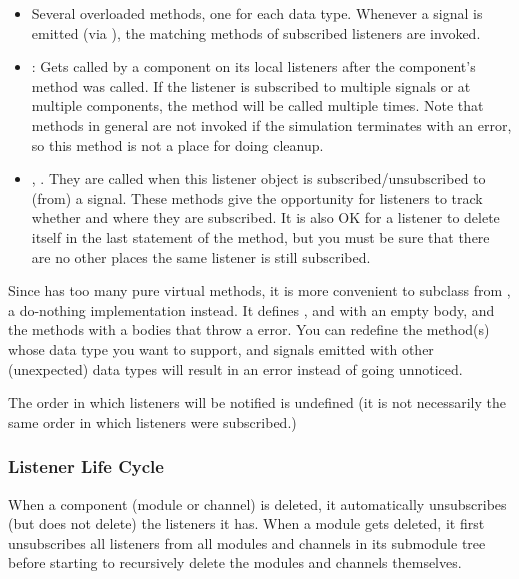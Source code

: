 \begin{itemize}
  \item Several overloaded  methods, one for each
    data type. Whenever a signal is emitted (via ),
    the matching  methods of subscribed listeners
    are invoked.
  \item {}: Gets called by a component on its local listeners
    after the component's  method was called. If the listener
    is subscribed to multiple signals or at multiple components, the method
    will be called multiple times. Note that  methods in general
    are not invoked if the simulation terminates with an error, so this method
    is not a place for doing cleanup.
  \item {}, . They are called
    when this listener object is subscribed/unsubscribed to (from) a signal.
    These methods give the opportunity for listeners to track whether
    and where they are subscribed. It is also OK for a listener to delete
    itself in the last statement of the  method,
    but you must be sure that there are no other places the same listener
    is still subscribed.
\end{itemize}

Since  has too many pure virtual methods, it is more
convenient to subclass from , a do-nothing implementation
instead. It defines ,  and
 with an empty body, and the 
methods with a bodies that throw a  error.
You can redefine the  method(s) whose data type
you want to support, and signals emitted with other (unexpected) data
types will result in an error instead of going unnoticed.

The order in which listeners will be notified is undefined (it is not necessarily
the same order in which listeners were subscribed.)

\subsubsection{Listener Life Cycle}
\label{sec:simple-modules:signals:life-cycle}

When a component (module or channel) is deleted, it automatically
unsubscribes (but does not delete) the listeners it has. When a
module gets deleted, it first unsubscribes all listeners from all
modules and channels in its submodule tree before starting
to recursively delete the modules and channels themselves.

